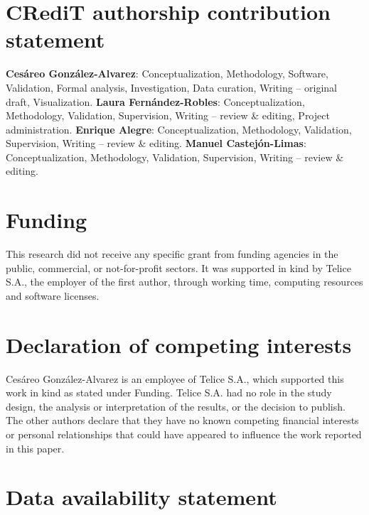 \documentclass[preprint,review,12pt]{elsarticle}
\begin{document}
\section*{CRediT authorship contribution statement} %

\textbf{Cesáreo González-Alvarez}: Conceptualization, Methodology, Software, Validation, Formal analysis, Investigation, Data curation, Writing -- original draft, Visualization.
\textbf{Laura Fernández-Robles}: Conceptualization, Methodology, Validation, Supervision, Writing -- review \& editing, Project administration.
\textbf{Enrique Alegre}: Conceptualization, Methodology, Validation, Supervision, Writing -- review \& editing.
\textbf{Manuel Castejón-Limas}: Conceptualization, Methodology, Validation, Supervision, Writing -- review \& editing.

\section*{Funding}

This research did not receive any specific grant from funding agencies in the public, commercial, or not-for-profit sectors. It was supported in kind by Telice S.A., the employer of the first author, through working time, computing resources and software licenses.

\section*{Declaration of competing interests}

Cesáreo González-Alvarez is an employee of Telice S.A., which supported this work in kind as stated under Funding. Telice S.A. had no role in the study design, the analysis or interpretation of the results, or the decision to publish. The other authors declare that they have no known competing financial interests or personal relationships that could have appeared to influence the work reported in this paper.

\section*{Data availability statement}
\end{document}
